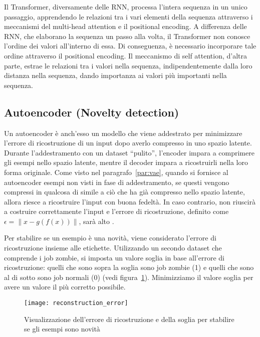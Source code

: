 Il Transformer, diversamente delle RNN, processa l'intera sequenza in un unico
passaggio, apprendendo le relazioni tra i vari elementi della sequenza
attraverso i meccanismi del multi-head attention e il positional encoding. A
differenza delle RNN, che elaborano la sequenza un passo alla volta, il
Transformer non conosce l'ordine dei valori all'interno di essa. Di
conseguenza, è necessario incorporare tale ordine attraverso il positional
encoding. Il meccanismo di self attention, d'altra parte, estrae le relazioni
tra i valori nella sequenza, indipendentemente dalla loro distanza nella
sequenza, dando importanza ai valori più importanti nella sequenza.

\subsection{Autoencoder (Novelty detection)}
\label{sec:autoencoder}

Un autoencoder è anch'esso un modello che viene addestrato per minimizzare
l'errore di ricostruzione di un input dopo averlo compresso in uno spazio
latente. Durante l'addestramento con un dataset ``pulito'', l'encoder impara a
comprimere gli esempi nello spazio latente, mentre il decoder impara a
ricostruirli nella loro forma originale. Come visto nel
paragrafo~\ref{par:vae}, quando si fornisce al autoencoder esempi non visti in
fase di addestramento, se questi vengono compressi in qualcosa di simile a ciò
che ha già compresso nello spazio latente, allora riesce a ricostruire l'input
con buona fedeltà. In caso contrario, non riuscirà a costruire correttamente
l'input e l'errore di ricostruzione, definito come $\epsilon=\lVert
x-g(f(x))\rVert$, sarà alto \cite{borghesi2019}.

Per stabilire se un esempio è una novità, viene considerato l'errore di
ricostruzione insieme alle etichette. Utilizzando un secondo dataset che
comprende i job zombie, si imposta un valore soglia in base all'errore di
ricostruzione: quelli che sono sopra la soglia sono job zombie (1) e quelli
che sono al di sotto sono job normali (0) (vedi
figura~\ref{fig:reconstruction_error}). Minimizziamo il valore soglia per
avere un valore il più corretto possibile.

\begin{figure}[!ht]
    \centering
    \texttt{[image: reconstruction\_error]}
    \caption{Visualizzazione dell'errore di ricostruzione e della soglia per
    stabilire se gli esempi sono novità}
    \label{fig:reconstruction_error}
\end{figure}

